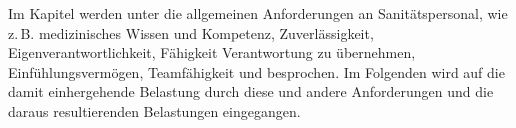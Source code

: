 Im Kapitel   werden unter
 die allgemeinen Anforderungen an Sanitätspersonal, wie
z.\,B. medizinisches Wissen und Kompetenz, Zuverlässigkeit, 
Eigenverantwortlichkeit, Fähigkeit Verantwortung
zu übernehmen, Einfühlungsvermögen, Teamfähigkeit und 
 besprochen. Im Folgenden wird auf
die damit einhergehende Belastung durch diese und andere
Anforderungen und die daraus resultierenden Belastungen
eingegangen.
% 
% 
% 
